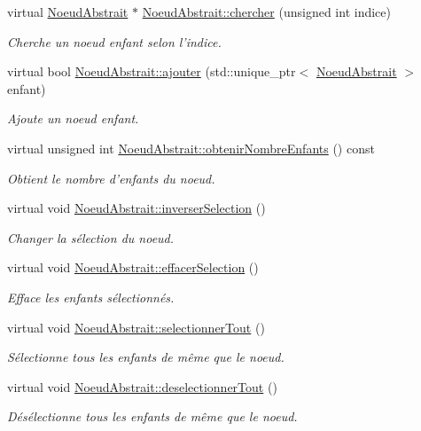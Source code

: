 \begin{DoxyCompactItemize}
virtual \hyperlink{class_noeud_abstrait}{Noeud\-Abstrait} $\ast$ \hyperlink{group__inf2990_ga13f7e9a637f7439b1a0cec0c49f6fa88}{Noeud\-Abstrait\-::chercher} (unsigned int indice)
\begin{DoxyCompactList}\small\item\em Cherche un noeud enfant selon l'indice. \end{DoxyCompactList}\item 
virtual bool \hyperlink{group__inf2990_ga7051399643afa57468ef07444a085a85}{Noeud\-Abstrait\-::ajouter} (std\-::unique\-\_\-ptr$<$ \hyperlink{class_noeud_abstrait}{Noeud\-Abstrait} $>$ enfant)
\begin{DoxyCompactList}\small\item\em Ajoute un noeud enfant. \end{DoxyCompactList}\item 
virtual unsigned int \hyperlink{group__inf2990_gad5a99959e905fc2d9f0fef16a02546a2}{Noeud\-Abstrait\-::obtenir\-Nombre\-Enfants} () const 
\begin{DoxyCompactList}\small\item\em Obtient le nombre d'enfants du noeud. \end{DoxyCompactList}\item 
virtual void \hyperlink{group__inf2990_ga2516eef94f98d4951baff6fd45020725}{Noeud\-Abstrait\-::inverser\-Selection} ()
\begin{DoxyCompactList}\small\item\em Changer la sélection du noeud. \end{DoxyCompactList}\item 
virtual void \hyperlink{group__inf2990_gaf6440c1b4ab6861f0ace6ba410c1fc84}{Noeud\-Abstrait\-::effacer\-Selection} ()
\begin{DoxyCompactList}\small\item\em Efface les enfants sélectionnés. \end{DoxyCompactList}\item 
virtual void \hyperlink{group__inf2990_gaa9b1fa06dad2695ea6870411c62652b3}{Noeud\-Abstrait\-::selectionner\-Tout} ()
\begin{DoxyCompactList}\small\item\em Sélectionne tous les enfants de même que le noeud. \end{DoxyCompactList}\item 
virtual void \hyperlink{group__inf2990_ga4f942bd122fc3402537ecac737c5248a}{Noeud\-Abstrait\-::deselectionner\-Tout} ()
\begin{DoxyCompactList}\small\item\em Désélectionne tous les enfants de même que le noeud. \end{DoxyCompactList}\item 

\end{DoxyCompactItemize}
